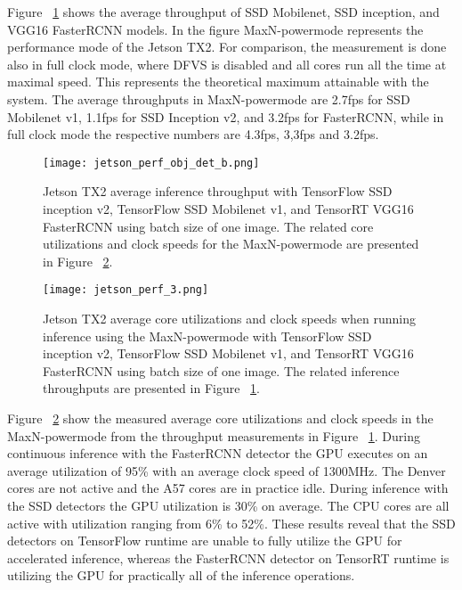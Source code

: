 \documentclass[sigconf]{acmart}
\begin{document}
Figure ~\ref{fig:jetson_perf_obj_det} shows the average throughput of SSD Mobilenet, SSD inception, and VGG16 FasterRCNN models.
In the figure MaxN-powermode represents the performance mode of the Jetson TX2. For comparison, the measurement is done also in full clock mode, where DFVS is disabled and all cores run all the time at maximal speed. This represents the theoretical maximum attainable with the system. The average throughputs in MaxN-powermode are 2.7fps for SSD Mobilenet v1, 1.1fps for SSD Inception v2, and 3.2fps for FasterRCNN, while in full clock mode the respective numbers are 4.3fps, 3,3fps and 3.2fps.

\begin{figure}[t]
\centering
\texttt{[image: jetson\_perf\_obj\_det\_b.png]}
\caption{Jetson TX2 average inference throughput with TensorFlow SSD inception v2, TensorFlow SSD Mobilenet v1, and TensorRT VGG16 FasterRCNN using batch size of one image. The related core utilizations and clock speeds for the MaxN-powermode are presented in Figure ~\ref{fig:jetson_perf_3}.}

\label{fig:jetson_perf_obj_det}
\end{figure}\begin{figure}[t]
\centering
\texttt{[image: jetson\_perf\_3.png]}
\caption{Jetson TX2 average core utilizations and clock speeds when running inference using the MaxN-powermode with TensorFlow SSD inception v2, TensorFlow SSD Mobilenet v1, and TensorRT VGG16 FasterRCNN using batch size of one image. The related inference throughputs are presented in Figure ~\ref{fig:jetson_perf_obj_det}.}
\label{fig:jetson_perf_3}
\end{figure}

Figure ~\ref{fig:jetson_perf_3} show the measured average core utilizations and clock speeds in the MaxN-powermode from the throughput measurements in Figure ~\ref{fig:jetson_perf_obj_det}. During continuous inference with the FasterRCNN detector the GPU executes on an average utilization of 95\% with an average clock speed of 1300MHz. The Denver cores are not active and the A57 cores are in practice idle. During inference with the SSD detectors the GPU utilization is 30\% on average. The CPU cores are all active with utilization ranging from 6\% to 52\%. These results reveal that the SSD detectors on TensorFlow runtime are unable to fully utilize the GPU for accelerated inference, whereas the FasterRCNN detector on TensorRT runtime is utilizing the GPU for practically all of the inference operations.
\end{document}
